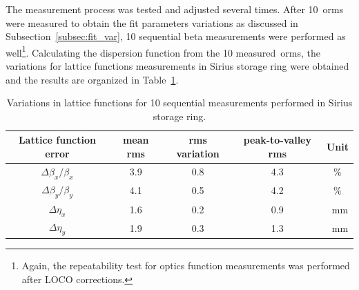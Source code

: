 The measurement process was tested and adjusted several times. After 10~\gls{orm}s were measured to obtain the fit parameters variations as discussed in Subsection~\ref{subsec:fit_var}, 10 sequential beta measurements were performed as well\footnote{Again, the repeatability test for optics function measurements was performed after LOCO corrections.}. Calculating the dispersion function from the 10 measured~\gls{orm}s, the variations for lattice functions measurements in Sirius storage ring were obtained and the results are organized in Table~\ref{tab:twiss_var_meas}.
\begin{table}
    \centering
    \caption{Variations in lattice functions for 10 sequential measurements performed in Sirius storage ring.}
    \label{tab:twiss_var_meas}
    \begin{tabular}{ccccc}
        \toprule\toprule
        Lattice function error & mean rms & rms variation & peak-to-valley rms & Unit \\
        \hline
        $\Delta \beta_x/\beta_x$ & \num{3.9}& \num{0.8}  & \num{4.3} & \%\\
        $\Delta \beta_y/\beta_y$ & \num{4.1} & \num{0.5} & \num{4.2} & \% \\
        $\Delta \eta_x$ & \num{1.6} & \num{0.2} &          \num{0.9} &   \SI{}{\milli\meter}\\
        $\Delta \eta_y$ & \num{1.9} & \num{0.3} &          \num{1.3} & \SI{}{\milli\meter} \\
        \bottomrule\bottomrule
    \end{tabular}
\end{table}

